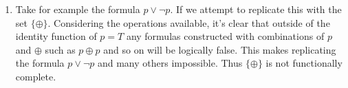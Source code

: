 \documentclass{article}
\begin{document}
\begin{enumerate}
        \item Take for example the formula $p \lor \neg p$. If we attempt to replicate this with the set $\{\oplus\}$. Considering the operations available, it's clear that outside of the identity function of $p = T$ any formulas constructed with combinations of $p$ and $\oplus$ such as $p \oplus p$ and so on will be logically false. This makes replicating the formula $p \lor \neg p$ and many others impossible. Thus $\{\oplus\}$ is not functionally complete. 
    \end{enumerate}
\end{document}
